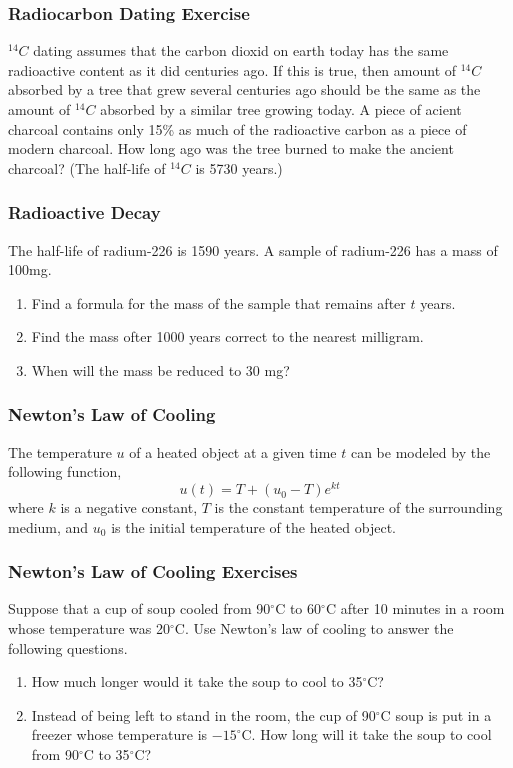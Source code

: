 \documentclass[xcolor=dvipsnames]{beamer}
\begin{document}
\begin{frame}
  \frametitle{Radiocarbon Dating Exercise}
  $^{14}C$ dating assumes that the carbon dioxid on earth today has
  the same radioactive content as it did centuries ago. If this is
  true, then amount of $^{14}C$ absorbed by a tree that grew several
  centuries ago should be the same as the amount of $^{14}C$ absorbed
  by a similar tree growing today. A piece of acient charcoal contains
  only 15\% as much of the radioactive carbon as a piece of modern
  charcoal. How long ago was the tree burned to make the ancient
  charcoal? (The half-life of $^{14}C$ is 5730 years.)
\end{frame}

\begin{frame}
  \frametitle{Radioactive Decay}
The half-life of radium-226 is 1590 years. A sample of radium-226 has
a mass of 100mg. 
\begin{enumerate}
\item<1-> Find a formula for the mass of the sample that
remains after $t$ years.
\item<2-> Find the mass ofter 1000 years correct to the nearest
  milligram.
\item<3-> When will the mass be reduced to 30 mg?
\end{enumerate}
\end{frame}

\begin{frame}
  \frametitle{Newton's Law of Cooling}
The temperature $u$ of a heated object at a given time $t$ can be
modeled by the following function,
\begin{equation}
  \label{eq:iemahbec}
  u(t)=T+(u_{0}-T)e^{kt}
\end{equation}
where $k$ is a negative constant, $T$ is the constant temperature of
the surrounding medium, and $u_{0}$ is the initial temperature of the
heated object.
\end{frame}

\begin{frame}
  \frametitle{Newton's Law of Cooling Exercises}
{\ubung} Suppose that a cup of soup cooled from 90$^{\circ}$C to 60$^{\circ}$C
after 10 minutes in a room whose temperature was 20$^{\circ}$C. Use Newton's
law of cooling to answer the following questions.
\begin{enumerate}
\item How much longer would it take the soup to cool to 35$^{\circ}$C?
\item Instead of being left to stand in the room, the cup of 90$^{\circ}$C soup
  is put in a freezer whose temperature is $-15^{\circ}$C. How long will it
  take the soup to cool from 90$^{\circ}$C to 35$^{\circ}$C?
\end{enumerate}
\end{frame}
\end{document}
